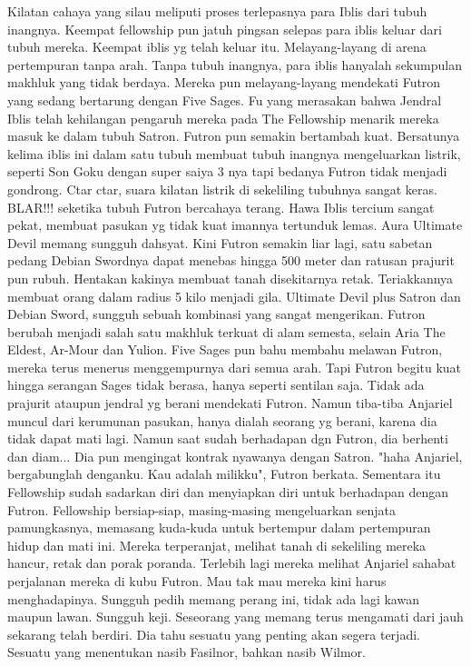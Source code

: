 \documentclass[a4paper,11pt,final]{article}
\begin{document}
Kilatan cahaya yang silau meliputi proses terlepasnya para Iblis dari tubuh inangnya. Keempat fellowship pun jatuh pingsan selepas para iblis keluar dari tubuh mereka. Keempat iblis yg telah keluar itu.
Melayang-layang di arena pertempuran tanpa arah. Tanpa tubuh inangnya, para iblis hanyalah sekumpulan makhluk yang tidak berdaya. Mereka pun melayang-layang mendekati Futron yang sedang bertarung dengan Five Sages.
Fu yang merasakan bahwa Jendral Iblis telah kehilangan pengaruh mereka pada The Fellowship menarik mereka masuk ke dalam tubuh Satron. Futron pun semakin bertambah kuat.
Bersatunya kelima iblis ini dalam satu tubuh membuat tubuh inangnya mengeluarkan listrik, seperti Son Goku dengan super saiya 3 nya tapi bedanya Futron tidak menjadi gondrong. Ctar ctar, suara kilatan listrik di sekeliling tubuhnya sangat keras.
BLAR!!! seketika tubuh Futron bercahaya terang. Hawa Iblis tercium sangat pekat, membuat pasukan yg tidak kuat imannya tertunduk lemas. Aura Ultimate Devil memang sungguh dahsyat.
Kini Futron semakin liar lagi, satu sabetan pedang Debian Swordnya dapat menebas hingga 500 meter dan ratusan prajurit pun rubuh. Hentakan kakinya membuat tanah disekitarnya retak. Teriakkannya membuat orang dalam radius 5 kilo menjadi gila.
Ultimate Devil plus Satron dan Debian Sword, sungguh sebuah kombinasi yang sangat mengerikan. Futron berubah menjadi salah satu makhluk terkuat di alam semesta, selain Aria The Eldest, Ar-Mour dan Yulion.
Five Sages pun bahu membahu melawan Futron, mereka terus menerus menggempurnya dari semua arah. Tapi Futron begitu kuat hingga serangan Sages tidak berasa, hanya seperti sentilan saja.
Tidak ada prajurit ataupun jendral yg berani mendekati Futron. Namun tiba-tiba Anjariel muncul dari kerumunan pasukan, hanya dialah seorang yg berani, karena dia tidak dapat mati lagi. Namun saat sudah berhadapan dgn Futron, dia berhenti dan diam...
Dia pun mengingat kontrak nyawanya dengan Satron. "haha Anjariel, bergabunglah denganku. Kau adalah milikku", Futron berkata. Sementara itu Fellowship sudah sadarkan diri dan menyiapkan diri untuk berhadapan dengan Futron.
Fellowship bersiap-siap, masing-masing mengeluarkan senjata pamungkasnya, memasang kuda-kuda untuk bertempur dalam pertempuran hidup dan mati ini. Mereka terperanjat, melihat tanah di sekeliling mereka hancur, retak dan porak poranda.
Terlebih lagi mereka melihat Anjariel sahabat perjalanan mereka di kubu Futron. Mau tak mau mereka kini harus menghadapinya. Sungguh pedih memang perang ini, tidak ada lagi kawan maupun lawan. Sungguh keji.
Seseorang yang memang terus mengamati dari jauh sekarang telah berdiri. Dia tahu sesuatu yang penting akan segera terjadi. Sesuatu yang menentukan nasib Fasilnor, bahkan nasib Wilmor.
\end{document}
